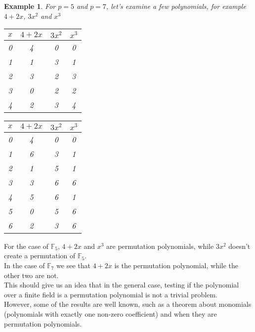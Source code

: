 \documentclass[letterpaper, bothsides, 12pt]{article} %
\newtheorem{example}{Example}
\begin{document}
\begin{example}
   For $p=5$ and $p=7$, let's examine a few polynomials, for example  $4+2x$, $3x^2$ and $x^3$ \\

\begin{minipage}{.5\linewidth}
      \centering
\begin{tabular}{cccc}
     $x$ & $4+2x$ & $3x^2$  & $x^3$ \\ [0.5ex] 
     \hline
        0 & 4 & 0 & 0 \\
        1 & 1 & 3 & 1 \\
        2 & 3 & 2 & 3 \\
        3 & 0 & 2 & 2 \\
        4 & 2 & 3 & 4 \\
    \end{tabular}
    \end{minipage}%
    \begin{minipage}{.5\linewidth}
      \centering
    \begin{tabular}{cccc}
     $x$ & $4+2x$ & $3x^2$  & $x^3$ \\ [0.5ex] 
     \hline
     0 &       4 &     0 &    0 \\
     1 &       6 &     3 &    1 \\
     2 &       1 &     5 &    1 \\
     3 &       3 &     6 &    6 \\
     4 &       5 &     6 &    1 \\
     5 &       0 &     5 &    6 \\
     6 &       2 &     3 &    6 \\
    \end{tabular}
    \end{minipage} 
\end{example}

For the case of $\mathbb{F}_5$, $4+2x$ and $x^3$ are permutation polynomials, while $3x^2$ doesn't create a permutation of $\mathbb{F}_{5}$. \\
In the case of $\mathbb{F}_{7}$ we see that $4+2x$ is the permutation polynomial, while the other two are not. \\

This should give us an idea that in the general case, testing if the polynomial over a finite field is a permutation polynomial is not a trivial problem. \\

However, some of the results are well known, such as a theorem about monomials (polynomials with exactly one non-zero coefficient) and when they are permutation polynomials. 
\end{document}

